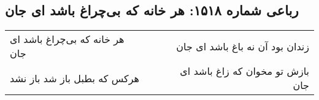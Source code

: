 \begin{center}
\section*{رباعی شماره ۱۵۱۸: هر خانه که بی‌چراغ باشد ای جان}
\label{sec:1518}
\begin{longtable}{l p{0.5cm} r}
هر خانه که بی‌چراغ باشد ای جان
&&
زندان بود آن نه باغ باشد ای جان
\\
هرکس که بطبل باز شد باز نشد
&&
بازش تو مخوان که زاغ باشد ای جان
\\
\end{longtable}
\end{center}
